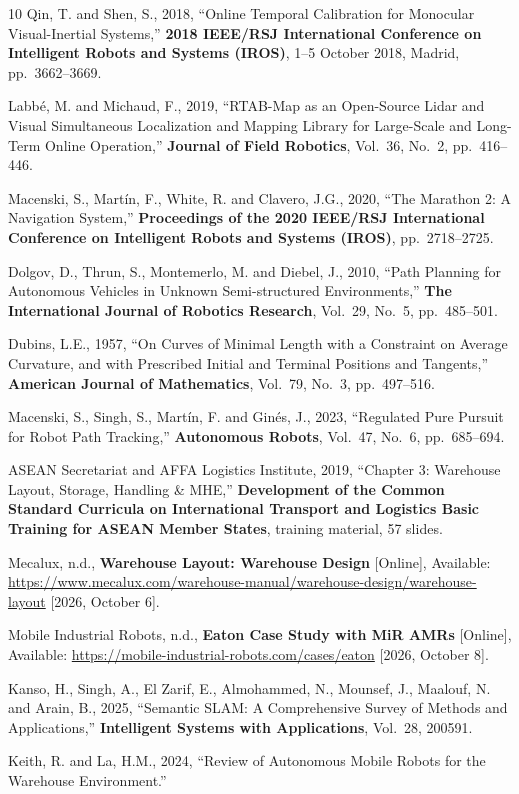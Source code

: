 \begin{thebibliography}{10}
Qin, T. and Shen, S., 2018, ``Online Temporal Calibration for Monocular
Visual-Inertial Systems,'' \textbf{2018 IEEE/RSJ International Conference on
Intelligent Robots and Systems (IROS)}, 1--5 October 2018, Madrid,
pp.~3662--3669.

Labb\'e, M. and Michaud, F., 2019, ``RTAB-Map as an Open-Source Lidar and
Visual Simultaneous Localization and Mapping Library for Large-Scale and
Long-Term Online Operation,'' \textbf{Journal of Field Robotics}, Vol.~36,
No.~2, pp.~416--446.

Macenski, S., Mart\'in, F., White, R. and Clavero, J.G., 2020, ``The Marathon 2:
A Navigation System,'' \textbf{Proceedings of the 2020 IEEE/RSJ International
Conference on Intelligent Robots and Systems (IROS)}, pp.~2718--2725.

Dolgov, D., Thrun, S., Montemerlo, M. and Diebel, J., 2010, ``Path Planning for
Autonomous Vehicles in Unknown Semi-structured Environments,'' \textbf{The
International Journal of Robotics Research}, Vol.~29, No.~5, pp.~485--501.

Dubins, L.E., 1957, ``On Curves of Minimal Length with a Constraint on Average
Curvature, and with Prescribed Initial and Terminal Positions and Tangents,''
\textbf{American Journal of Mathematics}, Vol.~79, No.~3, pp.~497--516.

Macenski, S., Singh, S., Mart\'in, F. and Gin\'es, J., 2023, ``Regulated Pure
Pursuit for Robot Path Tracking,'' \textbf{Autonomous Robots}, Vol.~47, No.~6,
pp.~685--694.

ASEAN Secretariat and AFFA Logistics Institute, 2019, ``Chapter 3: Warehouse
Layout, Storage, Handling \& MHE,'' \textbf{Development of the Common Standard
Curricula on International Transport and Logistics Basic Training for ASEAN
Member States}, training material, 57 slides.

Mecalux, n.d., \textbf{Warehouse Layout: Warehouse Design} [Online], Available:
\url{https://www.mecalux.com/warehouse-manual/warehouse-design/warehouse-layout}
[2026, October 6].

Mobile Industrial Robots, n.d., \textbf{Eaton Case Study with MiR AMRs} [Online],
Available: \url{https://mobile-industrial-robots.com/cases/eaton}
[2026, October 8].

Kanso, H., Singh, A., El Zarif, E., Almohammed, N., Mounsef, J., Maalouf, N. and
Arain, B., 2025, ``Semantic SLAM: A Comprehensive Survey of Methods and
Applications,'' \textbf{Intelligent Systems with Applications}, Vol.~28,
200591.

Keith, R. and La, H.M., 2024, ``Review of Autonomous Mobile Robots for the
Warehouse Environment.''

\end{thebibliography}
